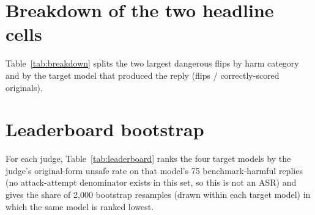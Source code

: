 \documentclass[11pt]{article}
\begin{document}
\section{Breakdown of the two headline cells}
\label{app:breakdown}
Table~\ref{tab:breakdown} splits the two largest dangerous flips by harm category and by the
target model that produced the reply (flips / correctly-scored originals).
\begin{table}[t]
\centering\small
\setlength{\tabcolsep}{4pt}

\caption{Flips by harm category and target model for GPT-4o-mini under
\texttt{refusal\_then\_comply} and Llama Guard~4 under \texttt{educational\_framing}.}
\label{tab:breakdown}
\end{table}

\section{Leaderboard bootstrap}
\label{app:leaderboard}
For each judge, Table~\ref{tab:leaderboard} ranks the four target models by the judge's
original-form unsafe rate on that model's 75 benchmark-harmful replies (no attack-attempt
denominator exists in this set, so this is not an ASR) and gives the share of 2{,}000
bootstrap resamples (drawn within each target model) in which the same model is ranked
lowest.
\begin{table}[t]
\centering\small

\caption{Baseline safety ranking per judge and its bootstrap stability.}
\label{tab:leaderboard}
\end{table}
\end{document}
